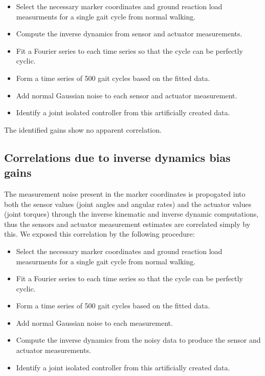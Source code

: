 \documentclass{article}
\begin{document}
\begin{itemize}
  \item Select the necessary marker coordinates and ground reaction load
    measurments for a single gait cycle from normal walking.
  \item Compute the inverse dynamics from sensor and actuator measurements.
  \item Fit a Fourier series to each time series so that the cycle can be
    perfectly cyclic.
  \item Form a time series of 500 gait cycles based on the fitted data.
  \item Add normal Gaussian noise to each sensor and actuator measurement.
  \item Identify a joint isolated controller from this artificially created
    data.
\end{itemize}

The identified gains show no apparent correlation. 

\subsection*{Correlations due to inverse dynamics bias gains}
%
The measurement noise present in the marker coordinates is propogated into both
the sensor values (joint angles and angular rates) and the actuator values
(joint torques) through the inverse kinematic and inverse dynamic computations,
thus the sensors and actuator measurement estimates are correlated simply by
this. We exposed this correlation by the following procedure:

\begin{itemize}
  \item Select the necessary marker coordinates and ground reaction load
    measurments for a single gait cycle from normal walking.
  \item Fit a Fourier series to each time series so that the cycle can be
    perfectly cyclic.
  \item Form a time series of 500 gait cycles based on the fitted data.
  \item Add normal Gaussian noise to each measurement.
  \item Compute the inverse dynamics from the noisy data to produce the sensor
    and actuator measurements.
  \item Identify a joint isolated controller from this artificially created
    data.
\end{itemize}
\end{document}
